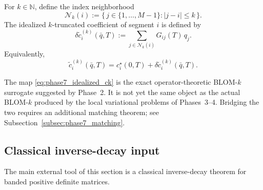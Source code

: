 \begin{definition}
	\label{def:phase7_idealized_truncation}
	For \(k\in\mathbb N\), define the index neighborhood
	\begin{equation}
		\label{eq:phase7_Nk}
		\mathcal N_k(i):=\{\,j\in\{1,\dots,M-1\}: |j-i|\le k\,\}.
	\end{equation}
	The idealized \(k\)-truncated coefficient of segment \(i\) is defined by
	\begin{equation}
		\label{eq:phase7_idealized_ck}
		\delta \tilde c_i^{(k)}(\bar q,T)
		:=
		\sum_{j\in\mathcal N_k(i)} G_{ij}(T)\,q_j.
	\end{equation}
	Equivalently,
	\begin{equation}
		\label{eq:phase7_idealized_ck_full}
		\tilde c_i^{(k)}(\bar q,T)
		=
		c_i^\star(0,T)+\delta \tilde c_i^{(k)}(\bar q,T).
	\end{equation}
\end{definition}

\begin{remark}
	\label{rem:phase7_idealized_truncation}
	The map \eqref{eq:phase7_idealized_ck} is the exact operator-theoretic BLOM-\(k\) surrogate suggested by Phase~2.
	It is not yet the same object as the actual BLOM-\(k\) produced by the local variational problems of Phases~3--4.
	Bridging the two requires an additional matching theorem; see Subsection~\ref{subsec:phase7_matching}.
\end{remark}

\subsection{Classical inverse-decay input}
\label{subsec:phase7_inverse_decay_input}

The main external tool of this section is a classical inverse-decay theorem for banded positive definite matrices.

